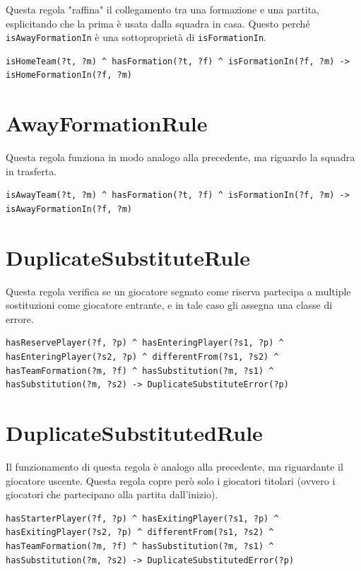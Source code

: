 \documentclass[11pt]{report} %
\begin{document}
Questa regola "raffina" il collegamento tra una formazione e una partita, esplicitando che la prima è usata dalla squadra in casa.
Questo perché \texttt{isAwayFormationIn} è una sottoproprietà di \texttt{isFormationIn}.

\begin{lstlisting}[language=SWRL]
isHomeTeam(?t, ?m) ^ hasFormation(?t, ?f) ^ isFormationIn(?f, ?m) -> isHomeFormationIn(?f, ?m)
\end{lstlisting}

\section{AwayFormationRule}

Questa regola funziona in modo analogo alla precedente, ma riguardo la squadra in trasferta.

\begin{lstlisting}[language=SWRL]
isAwayTeam(?t, ?m) ^ hasFormation(?t, ?f) ^ isFormationIn(?f, ?m) -> isAwayFormationIn(?f, ?m)
\end{lstlisting}

\newpage

\section{DuplicateSubstituteRule}

Questa regola verifica se un giocatore segnato come riserva partecipa a multiple sostituzioni come giocatore entrante, e in tale caso gli assegna una classe di errore.

\begin{lstlisting}[language=SWRL]
hasReservePlayer(?f, ?p) ^ hasEnteringPlayer(?s1, ?p) ^ hasEnteringPlayer(?s2, ?p) ^ differentFrom(?s1, ?s2) ^ hasTeamFormation(?m, ?f) ^ hasSubstitution(?m, ?s1) ^ hasSubstitution(?m, ?s2) -> DuplicateSubstituteError(?p)
\end{lstlisting}

\section{DuplicateSubstitutedRule}

Il funzionamento di questa regola è analogo alla precedente, ma riguardante il giocatore uscente.
Questa regola copre però solo i giocatori titolari (ovvero i giocatori che partecipano alla partita dall'inizio).

\begin{lstlisting}[language=SWRL]
hasStarterPlayer(?f, ?p) ^ hasExitingPlayer(?s1, ?p) ^ hasExitingPlayer(?s2, ?p) ^ differentFrom(?s1, ?s2) ^ hasTeamFormation(?m, ?f) ^ hasSubstitution(?m, ?s1) ^ hasSubstitution(?m, ?s2) -> DuplicateSubstitutedError(?p)
\end{lstlisting}
\end{document}
